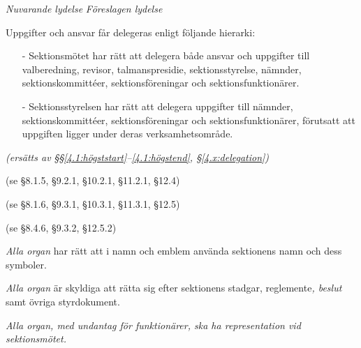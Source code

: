 \documentclass{article}
\newenvironment{lydelse}
    {\begin{paracol}{2}%
        \emph{Nuvarande lydelse}%
        \switchcolumn%
        \emph{Föreslagen lydelse}%
    \end{paracol}%
    \begin{enumerate}[label=\thesubsection.\arabic*]%
    \begin{paracol}{2}%
    }{\end{paracol}\end{enumerate}}
\begin{document}
\begin{lydelse}
  \switchcolumn*
  \setcounter{enumi}{1}
    
	  \item Uppgifter och ansvar får delegeras enligt följande hierarki:
		\begin{enumerate}
			\item[-] Sektionsmötet har rätt att delegera både ansvar och uppgifter till valberedning, revisor, talmanspresidie, sektionsstyrelse, nämnder, sektionskommittéer, sektionsföreningar och sektionsfunktionärer.
			\item[-] Sektionsstyrelsen har rätt att delegera uppgifter till nämnder,  sektionskommittéer, sektionsföreningar och sektionsfunktionärer, förutsatt att uppgiften ligger under deras verksamhetsområde.
		\end{enumerate}
	
	\switchcolumn
	  \emph{(ersätts av \S\S \ref{4.1:högststart}--\ref{4.1:högstend}, \S\ref{4.x:delegation})}
    
	\switchcolumn*
    \item[] (se \S 8.1.5, \S 9.2.1, \S 10.2.1, \S 11.2.1, \S 12.4)
  
    \item[] (se \S 8.1.6, \S 9.3.1, \S 10.3.1, \S 11.3.1, \S 12.5)

    \item[] (se \S 8.4.6, \S 9.3.2, \S 12.5.2)

  \switchcolumn
    \item \emph{Alla organ} har rätt att i namn och emblem använda sektionens namn och dess symboler.
      \label{4.1:emblem}

    \item \emph{Alla organ} är skyldiga att rätta sig efter sektionens stadgar, reglemente\emph{, beslut} samt övriga styrdokument.
      \label{4.1:rätta}
      
    \item \emph{Alla organ, med undantag för funktionärer, ska ha representation vid sektionsmötet.} \label{4.1:rep}


\end{lydelse}
\end{document}
